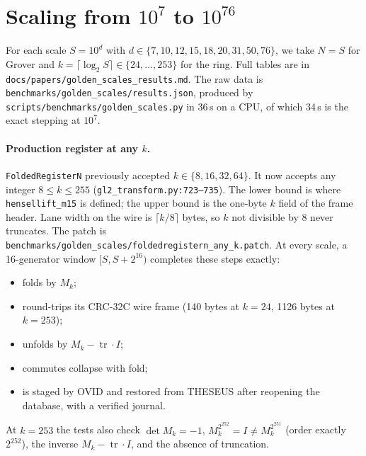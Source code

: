 \documentclass[11pt]{article}
\theoremstyle{definition}
\newcommand{\tr}{\operatorname{tr}}
\newcommand{\code}[1]{\texttt{\small #1}}
\begin{document}
\section{Scaling from $10^7$ to $10^{76}$}\label{sec:scales}
For each scale $S=10^d$ with $d\in\{7,10,12,15,18,20,31,50,76\}$, we take $N=S$ for Grover and
$k=\lceil\log_2S\rceil\in\{24,\dots,253\}$ for the ring. Full tables are in
\code{docs/papers/golden\_scales\_results.md}. The raw data is \code{benchmarks/golden\_scales/results.json},
produced by \code{scripts/benchmarks/golden\_scales.py} in 36\,s on a CPU, of which 34\,s is the exact stepping at
$10^7$.

\paragraph{Production register at any $k$.} \code{FoldedRegisterN} previously accepted $k\in\{8,16,32,64\}$. It now
accepts any integer $8\le k\le255$ (\code{gl2\_transform.py:723--735}). The lower bound is where
\code{hensellift\_m15} is defined; the upper bound is the one-byte $k$ field of the frame header. Lane width on the
wire is $\lceil k/8\rceil$ bytes, so $k$ not divisible by 8 never truncates. The patch is
\code{benchmarks/golden\_scales/foldedregistern\_any\_k.patch}. At every scale, a 16-generator window $[S,S+2^{16})$
completes these steps exactly:
\begin{itemize}
\item folds by $M_k$;
\item round-trips its CRC-32C wire frame (140 bytes at $k=24$, 1126 bytes at $k=253$);
\item unfolds by $M_k-\tr\cdot I$;
\item commutes collapse with fold;
\item is staged by OVID and restored from THESEUS after reopening the database, with a verified journal.
\end{itemize}
At $k=253$ the tests also check $\det M_k=-1$, $M_k^{2^{252}}=I\ne M_k^{2^{251}}$ (order exactly $2^{252}$), the
inverse $M_k-\tr\cdot I$, and the absence of truncation.
\end{document}
